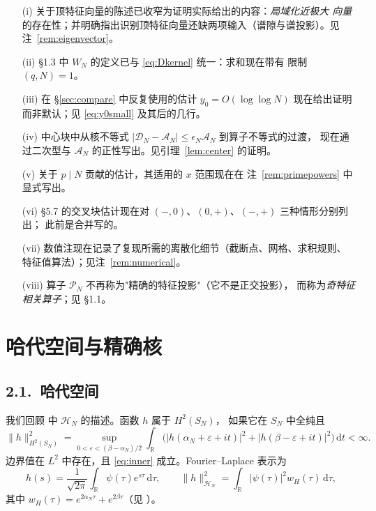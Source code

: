 \documentclass[12pt,a4paper]{amsart}
\numberwithin{equation}{section}
\theoremstyle{plain}
\theoremstyle{definition}
\newcommand{\dd}{\,\mathrm{d}}
\newcommand{\eps}{\varepsilon}
\begin{document}
\begin{enumerate}
\item[\rm(i)] 关于顶特征向量的陈述已收窄为证明实际给出的内容：\emph{局域化近极大
向量}的存在性；并明确指出识别顶特征向量还缺两项输入（谱隙与谱投影）。见注~\ref{rem:eigenvector}。
\item[\rm(ii)] \S1.3 中 $W_N$ 的定义已与 \eqref{eq:Dkernel} 统一：求和现在带有
限制 $(q,N)=1$。
\item[\rm(iii)] 在 \S\ref{sec:compare} 中反复使用的估计 $y_0=O(\log\log N)$
现在给出证明而非默认；见 \eqref{eq:y0small} 及其后的几行。
\item[\rm(iv)] 中心块中从核不等式
$|\mathscr D_N-\mathscr A_N|\le\epsilon_N\mathscr A_N$ 到算子不等式的过渡，
现在通过二次型与 $\mathscr A_N$ 的正性写出。见引理~\ref{lem:center} 的证明。
\item[\rm(v)] 关于 $p\mid N$ 贡献的估计，其适用的 $x$ 范围现在在
注~\ref{rem:primepowers} 中显式写出。
\item[\rm(vi)] \S5.7 的交叉块估计现在对 $(-,0)$、$(0,+)$、$(-,+)$ 三种情形分别列出；
此前是合并写的。
\item[\rm(vii)] 数值注现在记录了复现所需的离散化细节（截断点、网格、求积规则、
特征值算法）；见注~\ref{rem:numerical}。
\item[\rm(viii)] 算子 $\mathcal P_N$ 不再称为"精确的特征投影"（它不是正交投影），
而称为\emph{奇特征相关算子}；见 \S1.1。
\end{enumerate}

\section{哈代空间与精确核}\label{sec:kernel}

\subsection*{2.1.\ 哈代空间}

我们回顾 \cite[\S5]{LL} 中 $\mathcal H_N$ 的描述。函数 $h$ 属于 $H^2(S_N)$，
如果它在 $S_N$ 中全纯且
\[
 \|h\|^2_{H^2(S_N)}
 =\sup_{0<\eps<(\beta-\alpha_N)/2}
 \int_{\mathbb R}\bigl(|h(\alpha_N+\eps+it)|^2+|h(\beta-\eps+it)|^2\bigr)\dd t<\infty .
\]
边界值在 $L^2$ 中存在，且 \eqref{eq:inner} 成立。Fourier--Laplace 表示为
\begin{equation}\label{eq:PW}
 h(s)=\frac1{\sqrt{2\pi}}\int_{\mathbb R}\psi(\tau)e^{s\tau}\dd\tau,
 \qquad
 \|h\|^2_{\mathcal H_N}=\int_{\mathbb R}|\psi(\tau)|^2w_H(\tau)\dd\tau,
\end{equation}
其中 $w_H(\tau)=e^{2\alpha_N\tau}+e^{2\beta\tau}$（见 \cite[引理 5.2]{LL}）。
\end{document}
